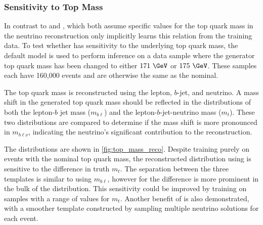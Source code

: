 \subsubsection{Sensitivity to Top Mass}

In contrast to \vweight and \ellipse, which both assume specific values for the top quark mass in the neutrino reconstruction \vvflows only implicitly learns this relation from the training data.
To test whether \vvflows has sensitivity to the underlying top quark mass, the default \vvflows model is used to perform inference on a data sample where the generator top quark mass has been changed to either $171~\GeV$ or $175~\GeV$.
These samples each have 160,000 events and are otherwise the same as the nominal.

The top quark mass is reconstructed using the lepton, $b$-jet, and neutrino.
A mass shift in the generated top quark mass should be reflected in the distributions of both the lepton-$b$ jet mass ($m_{b\ell}$) and the lepton-$b$-jet-neutrino mass ($m_t$).
These two distributions are compared to determine if the mass shift is more pronounced in $m_{b\ell\nu}$, indicating the neutrino's significant contribution to the reconstruction.

The distributions are shown in \cref{fig:top_mass_reco}.
Despite training purely on events with the nominal top quark mass, the reconstructed distribution using \vvflows is sensitive to the difference in truth $m_t$.
The separation between the three templates is similar to using $m_{b\ell}$, however for \vvflows the difference is more prominent in the bulk of the distribution.
This sensitivity could be improved by training \vvflows on samples with a range of values for $m_t$.
Another benefit of \vvflows is also demonstrated, with a smoother template constructed by sampling multiple neutrino solutions for each event.

